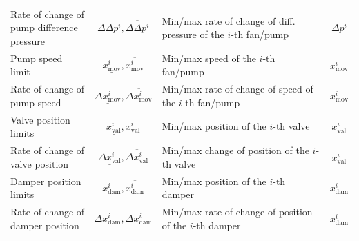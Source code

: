 \documentclass[10pt]{article}
\begin{document}
\begin{table}[ht]
\begin{adjustwidth}{-1.5cm}{}
\begin{tabular}{l|c|l|c}
		\makecell[l]{Rate of change of\\ pump difference pressure}   & $\underline{\Delta\Delta p^i},\overline{\Delta\Delta p^i}$ & \makecell[l]{Min/max rate of  change of \\ diff. pressure of the  $i$-th fan/pump} & $\Delta p^i$ \\
		Pump speed limit & $\underline{ x^i_{\text{mov}}},\overline{ x^i_{\text{mov}}}$ & \makecell[l]{Min/max  speed of \\  the  $i$-th fan/pump} & $x^i_{\text{mov}}$ \\
		\makecell[l]{Rate of change of\\ pump speed}  & $\underline{\Delta x^i_{\text{mov}}},\overline{\Delta x^i_{\text{mov}}}$ & \makecell[l]{Min/max rate of  change of \\ speed of the  $i$-th fan/pump} & $x^i_{\text{mov}}$ \\
		Valve position limits & $\underline{ x^i_{\text{val}}},\overline{ x^i_{\text{val}}}$ & \makecell[l]{Min/max position of \\  the  $i$-th valve} & $x^i_{\text{val}}$ \\
		\makecell[l]{Rate of change of\\ valve position}  & $\underline{\Delta x^i_{\text{val}}},\overline{\Delta x^i_{\text{val}}}$ & \makecell[l]{Min/max change of \\ position of the  $i$-th valve} & $x^i_{\text{val}}$ \\
		Damper position limits& $\underline{ x^i_{\text{dam}}},\overline{ x^i_{\text{dam}}}$ & \makecell[l]{Min/max position of \\  the  $i$-th damper} & $x^i_{\text{dam}}$ \\
		\makecell[l]{Rate of change of\\ damper position} 
		& $\underline{\Delta x^i_{\text{dam}}},\overline{\Delta x^i_{\text{dam}}}$ & \makecell[l]{Min/max rate of  change of \\ position of the  $i$-th damper} & $x^i_{\text{dam}}$ \\
		\bottomrule 
	\end{tabular}
	\end{adjustwidth}
\end{table}

\end{document}
